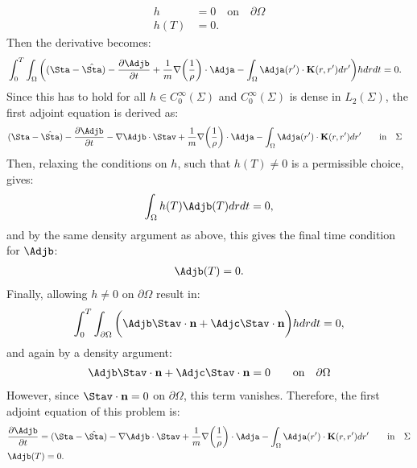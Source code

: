 \begin{align*}
h&=0 \quad \text{on} \quad \partial \Omega\\
h(T)&=0.
\end{align*}
Then the derivative becomes:
\begin{align*}
 &\int_0^T \int_\Omega \bigg((\Sta - \hat \Sta) - \frac{\partial \Adjb}{\partial t} +\frac{1}{m}\nabla \bigg(\frac{1}{\rho}\bigg)\cdot \Adja -  \int_\Omega  \Adja(r') \cdot\mathbf{K}(r,r')   dr'  \bigg)hdr dt =0.
\end{align*}
Since this has to hold for all $h \in C_0^\infty(\Sigma)$ and $C_0^\infty(\Sigma)$ is dense in $L_2(\Sigma)$, the first adjoint equation is derived as:
\begin{align}
&(\Sta - \hat \Sta) - \frac{\partial \Adjb}{\partial t} - \nabla \Adjb \cdot \Stav +\frac{1}{m}\nabla \bigg(\frac{1}{\rho}\bigg)\cdot \Adja  -  \int_\Omega  \Adja(r') \cdot\mathbf{K}(r,r')   dr'  \qquad \text{in} \quad \Sigma \notag
\end{align}
Then, relaxing the conditions on $h$, such that $h(T) \neq 0$ is a permissible choice, gives:
\begin{align*}
\int_\Omega h(T) \Adjb(T) dr dt=0,
\end{align*}
and by the same density argument as above, this gives the final time condition for $\Adjb$:
\begin{align*}
\Adjb(T) = {0} .
\end{align*}
Finally, allowing $h \neq 0$ on $\partial\Omega$ result in:
\begin{align*}
\int_0^T \int_{\partial \Omega} \bigg(  \Adjb \Stav \cdot \mathbf{n}   +\Adjc \Stav \cdot \mathbf{n}\bigg)h  dr dt=0,
\end{align*}
and again by a density argument:
\begin{align*}
  \Adjb \Stav \cdot \mathbf{n}   +\Adjc \Stav \cdot \mathbf{n} = 0\qquad \text{on} \quad \partial \Omega
\end{align*}
However, since $\Stav \cdot \mathbf{n} =0$ on $ \partial\Omega$, this term vanishes.
Therefore, the first adjoint equation of this problem is:
\begin{align*}
&  \frac{\partial \Adjb}{\partial t}  = (\Sta - \hat \Sta)- \nabla \Adjb \cdot \Stav +\frac{1}{m}\nabla \bigg(\frac{1}{\rho}\bigg)\cdot \Adja -  \int_\Omega  \Adja(r') \cdot\mathbf{K}(r,r')   dr'  \qquad \text{in} \quad \Sigma \\
 &\Adjb(T) = {0} .
\end{align*}


